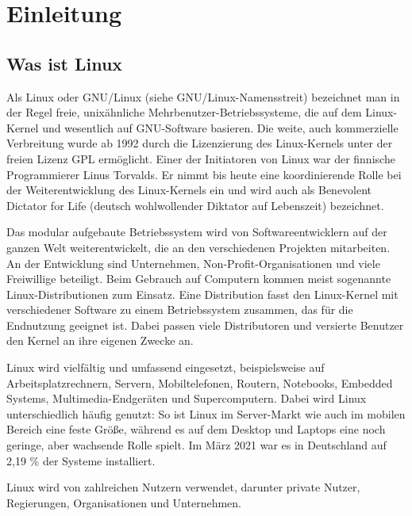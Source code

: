 \chapter{Einleitung}
\section{Was ist Linux}

Als Linux oder GNU/Linux (siehe GNU/Linux-Namensstreit) bezeichnet man in der Regel freie, unixähnliche Mehrbenutzer-Betriebssysteme, die auf dem Linux-Kernel und wesentlich auf GNU-Software basieren. Die weite, auch kommerzielle Verbreitung wurde ab 1992 durch die Lizenzierung des Linux-Kernels unter der freien Lizenz GPL ermöglicht. Einer der Initiatoren von Linux war der finnische Programmierer Linus Torvalds. Er nimmt bis heute eine koordinierende Rolle bei der Weiterentwicklung des Linux-Kernels ein und wird auch als Benevolent Dictator for Life (deutsch wohlwollender Diktator auf Lebenszeit) bezeichnet.

Das modular aufgebaute Betriebssystem wird von Softwareentwicklern auf der ganzen Welt weiterentwickelt, die an den verschiedenen Projekten mitarbeiten. An der Entwicklung sind Unternehmen, Non-Profit-Organisationen und viele Freiwillige beteiligt. Beim Gebrauch auf Computern kommen meist sogenannte Linux-Distributionen zum Einsatz. Eine Distribution fasst den Linux-Kernel mit verschiedener Software zu einem Betriebssystem zusammen, das für die Endnutzung geeignet ist. Dabei passen viele Distributoren und versierte Benutzer den Kernel an ihre eigenen Zwecke an.

Linux wird vielfältig und umfassend eingesetzt, beispielsweise auf Arbeitsplatzrechnern, Servern, Mobiltelefonen, Routern, Notebooks, Embedded Systems, Multimedia-Endgeräten und Supercomputern. Dabei wird Linux unterschiedlich häufig genutzt: So ist Linux im Server-Markt wie auch im mobilen Bereich eine feste Größe, während es auf dem Desktop und Laptops eine noch geringe, aber wachsende Rolle spielt. Im März 2021 war es in Deutschland auf 2,19 \% der Systeme installiert.

Linux wird von zahlreichen Nutzern verwendet, darunter private Nutzer, Regierungen, Organisationen und Unternehmen.

